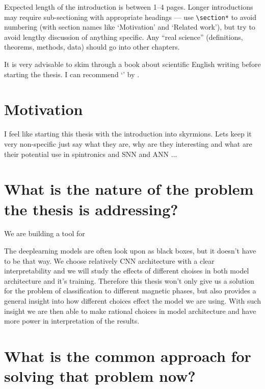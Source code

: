 


Expected length of the introduction is between 1--4 pages. Longer introductions may require sub-sectioning with appropriate headings --- use \texttt{\textbackslash{}section*} to avoid numbering (with section names like `Motivation' and `Related work'), but try to avoid lengthy discussion of anything specific. Any ``real science'' (definitions, theorems, methods, data) should go into other chapters.

It is very advisable to skim through a book about scientific English writing before starting the thesis. I can recommend `' by \citet{glasman2010science}.


\section{Motivation}

I feel like starting this thesis with the introduction into skyrmions. Lets keep it very non-specific just say what they are, why are they interesting and what are their potential use in spintronics and SNN and ANN \citet{chen2020nanoscale}...

\section{What is the nature of the problem the thesis is addressing?}

We are building a tool for 


The deeplearning models are often look upon as black boxes, but it doesn't have to be that way. We choose relatively CNN architecture with a clear interpretability and we will study the effects of different choises in both model architecture and it's training. Therefore this thesis won't only give us a solution for the problem of classification to different magnetic phases, but also provides a general insight into how different choices effect the model we are using. With such insight we are then able to make rational choices in model architecture and have more power in interpretation of the results. 

\section{What is the common approach for solving that problem now?}

